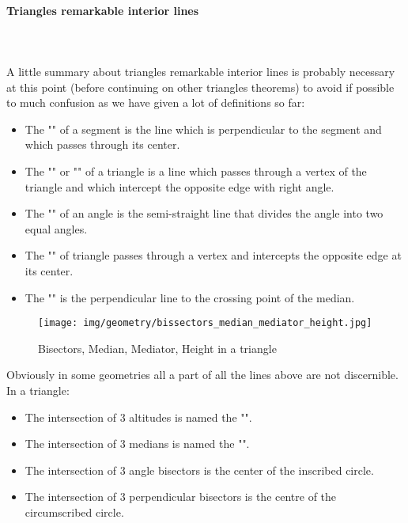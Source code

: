 	\paragraph{Triangles remarkable interior lines}\label{triangles remarkable interior lines}\mbox{}\\\\
	A little summary about triangles remarkable interior lines is probably necessary at this point (before continuing on other triangles theorems) to avoid if possible to much confusion as we have given a lot of definitions so far:
	\begin{itemize}
		\item The "" of a segment is the line which is perpendicular to the segment and which passes through its center.

		\item The "" or ""  of a triangle is a line which passes through a vertex of the triangle and which intercept the opposite edge with right angle.

		\item The "" of an angle is the semi-straight line that divides the angle into two equal angles.

		\item The "" of triangle passes through a vertex and intercepts the opposite edge at its center.

		\item The "" is the perpendicular line to the crossing point of the median.
	\end{itemize}
	\begin{figure}[H]
		\centering
		\texttt{[image: img/geometry/bissectors\_median\_mediator\_height.jpg]}
		\caption{Bisectors, Median, Mediator, Height in a triangle}
	\end{figure}
	Obviously in some geometries all a part of all the lines above are not discernible.
	In a triangle:
	\begin{itemize}
		\item The intersection of $3$ altitudes is named the "".
		\item The intersection of $3$ medians is named the "".
		\item The intersection of $3$ angle bisectors is the center of the inscribed circle.
		\item The intersection of $3$ perpendicular bisectors is the centre of the circumscribed circle.
	\end{itemize}
	
